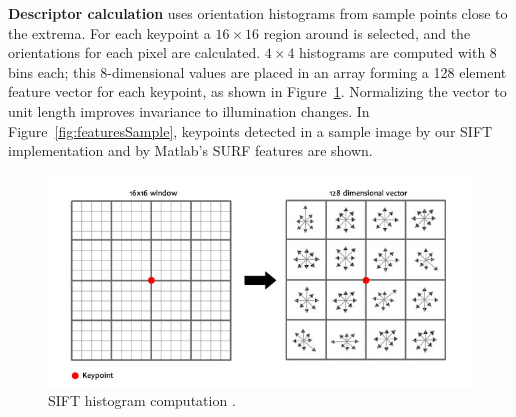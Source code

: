 \documentclass[12pt]{article}
\begin{document}
\textbf{Descriptor calculation} uses orientation histograms from sample points close to the extrema.
For each keypoint a $16 \times 16$ region around is selected, and the orientations for each pixel are calculated.
$4 \times 4$ histograms are computed with 8 bins each; this 8-dimensional values are placed in an array forming a 128 element feature vector for each keypoint, as shown in Figure~\ref{fig:histoCal}.
Normalizing the vector to unit length improves invariance to illumination changes.
In Figure~\ref{fig:featuresSample}, keypoints detected in a sample image by our SIFT implementation and by Matlab's SURF features are shown.

\begin{figure}[htbp!]
	\centering
	\includegraphics[scale=0.43]{images/siftHistograms}
	\caption{SIFT histogram computation \cite{Gu2013}.}
	\label{fig:histoCal}
\end{figure}
\end{document}
